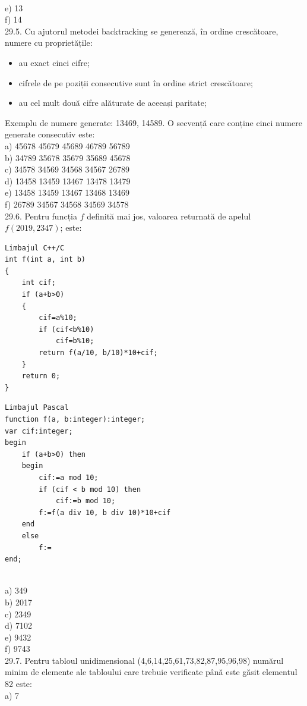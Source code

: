 \\
e) 13
\\
f) 14
\\
29.5. Cu ajutorul metodei backtracking se generează, în ordine crescătoare, numere cu proprietățile:
\begin{itemize}
  \item au exact cinci cifre;
  \item cifrele de pe poziții consecutive sunt în ordine strict crescătoare;
  \item au cel mult două cifre alăturate de aceeași paritate;
\end{itemize}
Exemplu de numere generate: 13469, 14589. O secvență care conține cinci numere generate consecutiv este:
\\
a) 45678 45679 45689 46789 56789
\\
b) 34789 35678 35679 35689 45678
\\
c) 34578 34569 34568 34567 26789
\\
d) 13458 13459 13467 13478 13479
\\
e) 13458 13459 13467 13468 13469
\\
f) 26789 34567 34568 34569 34578
\\
29.6. Pentru funcția $f$ definită mai jos, valoarea returnată de apelul $f(2019,2347)$; este:
\begin{verbatim}
Limbajul C++/C
int f(int a, int b)
{
    int cif;
    if (a+b>0)
    {
        cif=a%10;
        if (cif<b%10)
            cif=b%10;
        return f(a/10, b/10)*10+cif;
    }
    return 0;
}
\end{verbatim}
\begin{verbatim}
Limbajul Pascal
function f(a, b:integer):integer;
var cif:integer;
begin
    if (a+b>0) then
    begin
        cif:=a mod 10;
        if (cif < b mod 10) then
            cif:=b mod 10;
        f:=f(a div 10, b div 10)*10+cif
    end
    else
        f:=
end;
\end{verbatim}
\\
a) 349
\\
b) 2017
\\
c) 2349
\\
d) 7102
\\
e) 9432
\\
f) 9743
\\
29.7. Pentru tabloul unidimensional (4,6,14,25,61,73,82,87,95,96,98) numărul minim de elemente ale tabloului care trebuie verificate până este găsit elementul 82 este:
\\
a) 7
\\
